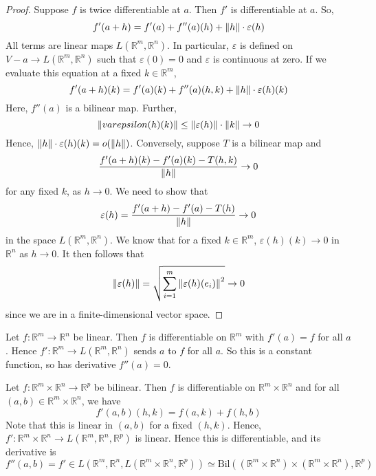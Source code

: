 \begin{proof}
	Suppose \( f \) is twice differentiable at \( a \).
	Then \( f' \) is differentiable at \( a \).
	So,
	\[
		f'(a+h) = f'(a) + f''(a)(h) + \norm{h} \cdot \varepsilon(h)
	\]
	All terms are linear maps \( L(\mathbb R^m, \mathbb R^n) \).
	In particular, \( \varepsilon \) is defined on \( V - a \to L(\mathbb R^m, \mathbb R^n) \) such that \( \varepsilon(0) = 0 \) and \( \varepsilon \) is continuous at zero.
	If we evaluate this equation at a fixed \( k \in \mathbb R^m \),
	\[
		f'(a+h)(k) = f'(a)(k) + f''(a)(h,k) + \norm{h} \cdot \varepsilon(h)(k)
	\]
	Here, \( f''(a) \) is a bilinear map.
	Further,
	\[
		\norm{varepsilon(h)(k)} \leq \norm{\varepsilon(h)} \cdot \norm{k} \to 0
	\]
	Hence, \( \norm{h} \cdot \varepsilon(h)(k) = o\qty(\norm{h}) \).
	Conversely, suppose \( T \) is a bilinear map and
	\[
		\frac{f'(a+h)(k) - f'(a)(k) - T(h,k)}{\norm{h}} \to 0
	\]
	for any fixed \( k \), as \( h \to 0 \).
	We need to show that
	\[
		\varepsilon(h) = \frac{f'(a+h) - f'(a) - T(h)}{\norm{h}} \to 0
	\]
	in the space \( L(\mathbb R^m, \mathbb R^n) \).
	We know that for a fixed \( k \in \mathbb R^m \), \( \varepsilon(h)(k) \to 0 \) in \( \mathbb R^n \) as \( h \to 0 \).
	It then follows that
	\[
		\norm{\varepsilon(h)} = \sqrt{\sum_{i=1}^m \norm{\varepsilon(h)(e_i)}^2} \to 0
	\]
	since we are in a finite-dimensional vector space.
\end{proof}
\begin{example}
	Let \( f \colon \mathbb R^m \to \mathbb R^n \) be linear.
	Then \( f \) is differentiable on \( \mathbb R^m \) with \( f'(a) = f \) for all \( a \).
	Hence \( f' \colon \mathbb R^m \to L(\mathbb R^m, \mathbb R^n) \) sends \( a \) to \( f \) for all \( a \).
	So this is a constant function, so has derivative \( f''(a) = 0 \).
\end{example}
\begin{example}
	Let \( f \colon \mathbb R^m \times \mathbb R^n \to \mathbb R^p \) be bilinear.
	Then \( f \) is differentiable on \( \mathbb R^m \times \mathbb R^n \) and for all \( (a,b) \in \mathbb R^m \times \mathbb R^n \), we have
	\[
		f'(a,b)(h,k) = f(a,k) + f(h,b)
	\]
	Note that this is linear in \( (a,b) \) for a fixed \( (h,k) \).
	Hence, \( f' \colon \mathbb R^m \times \mathbb R^n \to L(\mathbb R^m, \mathbb R^n, \mathbb R^p) \) is linear.
	Hence this is differentiable, and its derivative is
	\[
		f''(a,b) = f' \in L(\mathbb R^m, \mathbb R^n, L(\mathbb R^m \times \mathbb R^n, \mathbb R^p)) \simeq \mathrm{Bil}((\mathbb R^m \times \mathbb R^n) \times (\mathbb R^m \times \mathbb R^n), \mathbb R^p)
	\]
\end{example}
